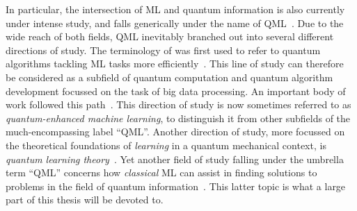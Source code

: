In particular, the intersection of \ac{ML} and quantum information is also currently under intense study, and falls generically under the name of \ac{QML}~\cite{wittek2014quantum,schuld2014introduction,adcock2015advances,biamonte2017quantum}.
Due to the wide reach of both fields, \ac{QML} inevitably branched out into several different directions of study.
The terminology of was first used to refer to quantum algorithms tackling \ac{ML} tasks more efficiently~\cite{giovannetti2008quantum,harrow2009quantum,lloyd2013quantum,lloyd2014quantum,rebentrost2014quantum,lloyd2016quantum,rebentrost2018quantum,rebentrost2016quantum}. This line of study can therefore be considered as a subfield of quantum computation and quantum algorithm development focussed on the task of big data processing. An important body of work followed this path~\cite{wittek2014quantum,schuld2014introduction,dunjko2017machine,ciliberto2018quantum,schuld2018supervised,perdomo-ortiz2018opportunities}. This direction of study is now sometimes referred to as \emph{quantum-enhanced machine learning}, to distinguish it from other subfields of the much-encompassing label ``\ac{QML}''.
Another direction of study, more focussed on the theoretical foundations of \emph{learning} in a quantum mechanical context, is \emph{quantum learning theory}~\cite{aaronson2007learnability,aaronson2017shadow,arunachalam2017survey,aaronson2018online,rocchetto2019experimental}.
Yet another field of study falling under the umbrella term ``\ac{QML}'' concerns how \emph{classical} \ac{ML} can assist in finding solutions to problems in the field of quantum information~\cite{zdeborov2017machine,spears2018deep,carleo2019machine}.
This latter topic is what a large part of this thesis will be devoted to.

